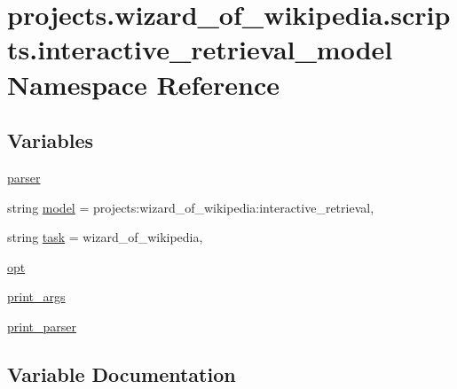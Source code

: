 \hypertarget{namespaceprojects_1_1wizard__of__wikipedia_1_1scripts_1_1interactive__retrieval__model}{}\section{projects.\+wizard\+\_\+of\+\_\+wikipedia.\+scripts.\+interactive\+\_\+retrieval\+\_\+model Namespace Reference}
\label{namespaceprojects_1_1wizard__of__wikipedia_1_1scripts_1_1interactive__retrieval__model}
\subsection*{Variables}
\begin{DoxyCompactItemize}
\item 
\hyperlink{namespaceprojects_1_1wizard__of__wikipedia_1_1scripts_1_1interactive__retrieval__model_af0ec369ed828df31d66ae8f6a6cc017e}{parser}
\item 
string \hyperlink{namespaceprojects_1_1wizard__of__wikipedia_1_1scripts_1_1interactive__retrieval__model_a3b512ec008f711ab3170443333e945cb}{model} = \textquotesingle{}projects\+:wizard\+\_\+of\+\_\+wikipedia\+:interactive\+\_\+retrieval\textquotesingle{},
\item 
string \hyperlink{namespaceprojects_1_1wizard__of__wikipedia_1_1scripts_1_1interactive__retrieval__model_a28b3ea102df78b1110d2bd7ffff44828}{task} = \textquotesingle{}wizard\+\_\+of\+\_\+wikipedia\textquotesingle{},
\item 
\hyperlink{namespaceprojects_1_1wizard__of__wikipedia_1_1scripts_1_1interactive__retrieval__model_afdd7e3cf2ffbd01ae839087beec532e6}{opt}
\item 
\hyperlink{namespaceprojects_1_1wizard__of__wikipedia_1_1scripts_1_1interactive__retrieval__model_a5495729edb61688640b558a38b7fafaf}{print\+\_\+args}
\item 
\hyperlink{namespaceprojects_1_1wizard__of__wikipedia_1_1scripts_1_1interactive__retrieval__model_a83414476fb9a6c53b0af1ce8b5c9292a}{print\+\_\+parser}
\end{DoxyCompactItemize}


\subsection{Variable Documentation}
\mbox{\label{namespaceprojects_1_1wizard__of__wikipedia_1_1scripts_1_1interactive__retrieval__model_a3b512ec008f711ab3170443333e945cb}} 
